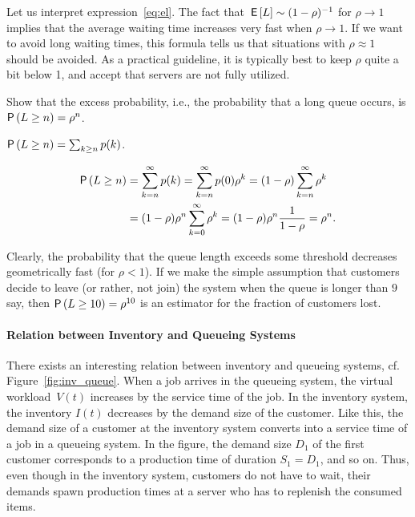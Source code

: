 Let us interpret expression~\eqref{eq:el}.
The fact that $\,\mathsf{E}\left[L\right] \sim (1-\rho)^{-1}$ for $\rho\to 1$ implies that the average waiting time increases very fast when $\rho\to1$.
If we want to avoid long waiting times, this formula tells us that situations with $\rho\approx 1$ should be avoided.
As a practical guideline, it is typically best to keep $\rho$ quite a bit below 1, and accept that servers are not fully utilized.


\begin{exercise}
  Show that the excess probability, i.e., the probability that a long queue occurs, is 
$\P{L\geq n} = \rho^n$.
  \begin{hint}
$\P{L\geq n} = \sum_{k\geq n} p(k)$.
  \end{hint}
  \begin{solution}
    \begin{equation*}
      \begin{split}
 \P{L\geq n} 
 &= \sum_{k=n}^\infty p(k) = \sum_{k=n}^\infty p(0)\rho^k = (1-\rho)\sum_{k=n}^\infty \rho^k \\
 &= (1-\rho)\rho^n \sum_{k=0}^\infty\rho^k = (1-\rho) \rho^n \frac1{1-\rho} = \rho^n.
\end{split}
\end{equation*}
\end{solution}
\end{exercise}

Clearly, the probability that the queue length exceeds some threshold decreases geometrically fast (for $\rho<1$).
If we make the simple assumption that customers decide to leave (or rather, not join) the system when the queue is longer than $9$ say, then $\P{L\geq 10} = \rho^{10}$ is an estimator for the fraction of customers lost.



\paragraph{Relation between Inventory and Queueing Systems}

There exists an interesting relation between inventory and queueing systems, cf. Figure~\ref{fig:inv_queue}.  When a job arrives in the queueing system, the virtual workload~$V(t)$ increases by the service time of the job. In the inventory system, the inventory $I(t)$ decreases by the  demand size of the customer. Like this, the demand size of a customer at the inventory system converts into a service time of a job in a queueing  system. In the figure, the demand size $D_1$  of the first customer corresponds to a production time of duration  $S_1=D_1$, and so on. Thus, even though in the inventory system, customers do not have to wait, their demands spawn production times at a server who has to replenish the consumed items. 

